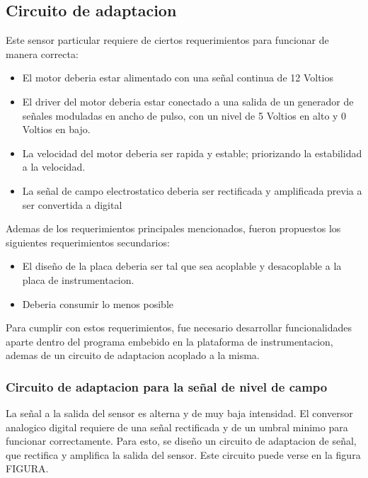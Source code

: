 \subsection{Circuito de adaptacion} %
\label{sub:circuito_de_adaptacion}


Este sensor particular requiere de ciertos requerimientos para funcionar de manera correcta:

\begin{itemize}
  \item El motor deberia estar alimentado con una señal continua de 12 Voltios
  \item El driver del motor deberia estar conectado a una salida de un generador de señales moduladas en ancho de pulso, con un nivel de 5 Voltios en alto y 0 Voltios en bajo.
  \item La velocidad del motor deberia ser rapida y estable; priorizando la estabilidad a la velocidad.
  \item La señal de campo electrostatico deberia ser rectificada y amplificada previa a ser convertida a digital
\end{itemize}


Ademas de los requerimientos principales mencionados, fueron propuestos los siguientes requerimientos secundarios:

\begin{itemize}
  \item El diseño de la placa deberia ser tal que sea acoplable y desacoplable a la placa de instrumentacion.
  \item Deberia consumir lo menos posible
\end{itemize}

Para cumplir con estos requerimientos, fue necesario desarrollar funcionalidades aparte dentro del programa embebido en la plataforma de instrumentacion, ademas de un circuito de adaptacion acoplado a la misma.

\subsubsection{Circuito de adaptacion para la señal de nivel de campo} %
\label{ssub:circuito_de_adaptacion_para_la_señal_de_nivel_de_campo}

La señal a la salida del sensor es alterna y de muy baja intensidad. El conversor analogico digital requiere de una señal rectificada y de un umbral minimo para funcionar correctamente. Para esto, se diseño un circuito de adaptacion de señal, que rectifica y amplifica la salida del sensor. Este circuito puede verse en la figura FIGURA.  

